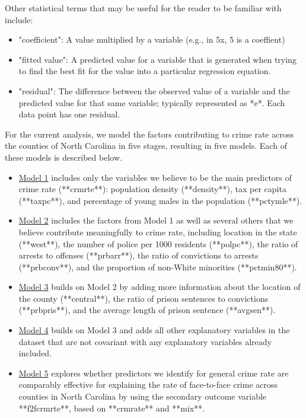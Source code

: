 \documentclass[]{article}
\begin{document}
Other statistical terms that may be useful for the reader to be familiar
with include:

\begin{itemize}
  \item "coefficient": A value multiplied by a variable (e.g., in 5x, 5 is a coeffient)
  \item "fitted value": A predicted value for a variable that is generated when trying to find the best fit for the value into a particular regression equation. 
  \item "residual": The difference between the observed value of a variable and the predicted value for that same variable; typically represented as *e*. Each data point has one residual.
\end{itemize}

For the current analysis, we model the factors contributing to crime
rate across the counties of North Carolina in five stages, resulting in
five models. Each of these models is described below.

\begin{itemize}
  \item \underline{Model 1} includes only the variables we believe to be the main predictors of crime rate (**crmrte**): population density (**density**), tax per capita (**taxpc**), and percentage of young males in the population (**pctymle**).  
  \item \underline{Model 2} includes the factors from Model 1 as well as several others that we believe contribute meaningfully to crime rate, including location in the state (**west**), the number of police per 1000 residents (**polpc**), the ratio of arrests to offenses (**prbarr**), the ratio of convictions to arrests (**prbconv**), and the proportion of non-White minorities (**pctmin80**).  
  \item \underline{Model 3} builds on Model 2 by adding more information about the location of the county (**central**), the ratio of prison sentences to convictions (**prbpris**), and the average length of prison sentence (**avgsen**).  
  \item \underline{Model 4} builds on Model 3 and adds all other explanatory variables in the dataset that are not covariant with any explanatory variables already included. 
  \item\underline{Model 5} explores whether predictors we identify for general crime rate are comparably effective for explaining the rate of face-to-face crime across counties in North Carolina by using the secondary outcome variable **f2fcrmrte**, based on **crmrate** and **mix**.
\end{itemize}
\end{document}
